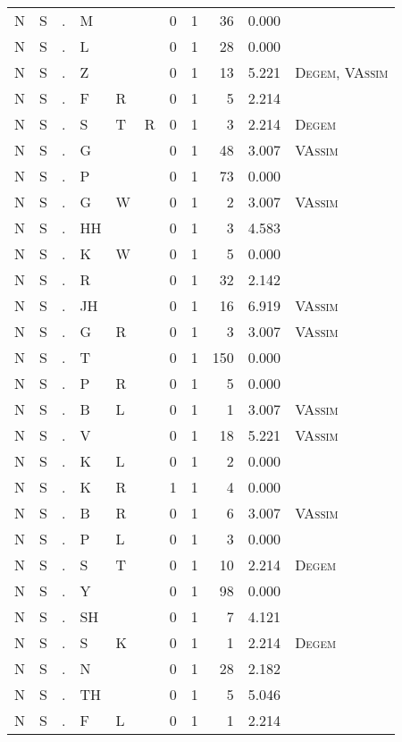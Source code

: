 \begin{longtable}{r@{ } r@{ } c@{ } l@{ } l@{ } l@{ } r r r r l }
N & S & . & M &  &  & 0 & 1 & 36 & 0.000 &  \\
N & S & . & L &  &  & 0 & 1 & 28 & 0.000 &  \\
N & S & . & Z &  &  & 0 & 1 & 13 & 5.221 & \textsc{Degem}, \textsc{VAssim} \\
N & S & . & F & R &  & 0 & 1 & 5 & 2.214 &  \\
N & S & . & S & T & R & 0 & 1 & 3 & 2.214 & \textsc{Degem} \\
N & S & . & G &  &  & 0 & 1 & 48 & 3.007 & \textsc{VAssim} \\
N & S & . & P &  &  & 0 & 1 & 73 & 0.000 &  \\
N & S & . & G & W &  & 0 & 1 & 2 & 3.007 & \textsc{VAssim} \\
N & S & . & HH &  &  & 0 & 1 & 3 & 4.583 &  \\
N & S & . & K & W &  & 0 & 1 & 5 & 0.000 &  \\
N & S & . & R &  &  & 0 & 1 & 32 & 2.142 &  \\
N & S & . & JH &  &  & 0 & 1 & 16 & 6.919 & \textsc{VAssim} \\
N & S & . & G & R &  & 0 & 1 & 3 & 3.007 & \textsc{VAssim} \\
N & S & . & T &  &  & 0 & 1 & 150 & 0.000 &  \\
N & S & . & P & R &  & 0 & 1 & 5 & 0.000 &  \\
N & S & . & B & L &  & 0 & 1 & 1 & 3.007 & \textsc{VAssim} \\
N & S & . & V &  &  & 0 & 1 & 18 & 5.221 & \textsc{VAssim} \\
N & S & . & K & L &  & 0 & 1 & 2 & 0.000 &  \\
N & S & . & K & R &  & 1 & 1 & 4 & 0.000 &  \\
N & S & . & B & R &  & 0 & 1 & 6 & 3.007 & \textsc{VAssim} \\
N & S & . & P & L &  & 0 & 1 & 3 & 0.000 &  \\
N & S & . & S & T &  & 0 & 1 & 10 & 2.214 & \textsc{Degem} \\
N & S & . & Y &  &  & 0 & 1 & 98 & 0.000 &  \\
N & S & . & SH &  &  & 0 & 1 & 7 & 4.121 &  \\
N & S & . & S & K &  & 0 & 1 & 1 & 2.214 & \textsc{Degem} \\
N & S & . & N &  &  & 0 & 1 & 28 & 2.182 &  \\
N & S & . & TH &  &  & 0 & 1 & 5 & 5.046 &  \\
N & S & . & F & L &  & 0 & 1 & 1 & 2.214 &  \\

\end{longtable}
